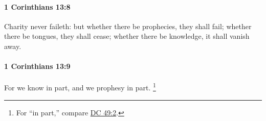 		\paragraph{1 Corinthians 13:8} %
			\label{1CORINTHIANS-13-8}

			Charity never faileth: but whether there be prophecies, they shall fail; whether there be tongues, they shall cease; whether there be knowledge, it shall vanish away.

			\begin{framed}
				\scriptsize
				\begin{compactdesc}
					\item[SBLG] 
				\end{compactdesc}
			\end{framed}

		\paragraph{1 Corinthians 13:9} %
			\label{1CORINTHIANS-13-9}

			For we know in part, and we prophesy in part.%
			\footnote{%
				For ``in part,'' compare \hyperref[DC49-2]{DC 49:2}.
				} 

